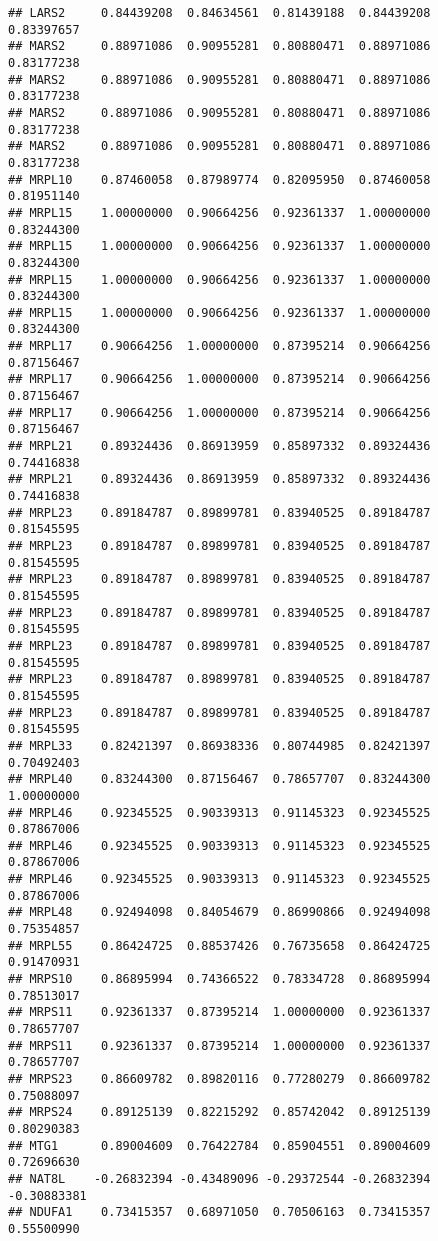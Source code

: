 \documentclass[
]{article}
\begin{document}
\begin{verbatim}
## LARS2     0.84439208  0.84634561  0.81439188  0.84439208  0.83397657
## MARS2     0.88971086  0.90955281  0.80880471  0.88971086  0.83177238
## MARS2     0.88971086  0.90955281  0.80880471  0.88971086  0.83177238
## MARS2     0.88971086  0.90955281  0.80880471  0.88971086  0.83177238
## MARS2     0.88971086  0.90955281  0.80880471  0.88971086  0.83177238
## MRPL10    0.87460058  0.87989774  0.82095950  0.87460058  0.81951140
## MRPL15    1.00000000  0.90664256  0.92361337  1.00000000  0.83244300
## MRPL15    1.00000000  0.90664256  0.92361337  1.00000000  0.83244300
## MRPL15    1.00000000  0.90664256  0.92361337  1.00000000  0.83244300
## MRPL15    1.00000000  0.90664256  0.92361337  1.00000000  0.83244300
## MRPL17    0.90664256  1.00000000  0.87395214  0.90664256  0.87156467
## MRPL17    0.90664256  1.00000000  0.87395214  0.90664256  0.87156467
## MRPL17    0.90664256  1.00000000  0.87395214  0.90664256  0.87156467
## MRPL21    0.89324436  0.86913959  0.85897332  0.89324436  0.74416838
## MRPL21    0.89324436  0.86913959  0.85897332  0.89324436  0.74416838
## MRPL23    0.89184787  0.89899781  0.83940525  0.89184787  0.81545595
## MRPL23    0.89184787  0.89899781  0.83940525  0.89184787  0.81545595
## MRPL23    0.89184787  0.89899781  0.83940525  0.89184787  0.81545595
## MRPL23    0.89184787  0.89899781  0.83940525  0.89184787  0.81545595
## MRPL23    0.89184787  0.89899781  0.83940525  0.89184787  0.81545595
## MRPL23    0.89184787  0.89899781  0.83940525  0.89184787  0.81545595
## MRPL23    0.89184787  0.89899781  0.83940525  0.89184787  0.81545595
## MRPL33    0.82421397  0.86938336  0.80744985  0.82421397  0.70492403
## MRPL40    0.83244300  0.87156467  0.78657707  0.83244300  1.00000000
## MRPL46    0.92345525  0.90339313  0.91145323  0.92345525  0.87867006
## MRPL46    0.92345525  0.90339313  0.91145323  0.92345525  0.87867006
## MRPL46    0.92345525  0.90339313  0.91145323  0.92345525  0.87867006
## MRPL48    0.92494098  0.84054679  0.86990866  0.92494098  0.75354857
## MRPL55    0.86424725  0.88537426  0.76735658  0.86424725  0.91470931
## MRPS10    0.86895994  0.74366522  0.78334728  0.86895994  0.78513017
## MRPS11    0.92361337  0.87395214  1.00000000  0.92361337  0.78657707
## MRPS11    0.92361337  0.87395214  1.00000000  0.92361337  0.78657707
## MRPS23    0.86609782  0.89820116  0.77280279  0.86609782  0.75088097
## MRPS24    0.89125139  0.82215292  0.85742042  0.89125139  0.80290383
## MTG1      0.89004609  0.76422784  0.85904551  0.89004609  0.72696630
## NAT8L    -0.26832394 -0.43489096 -0.29372544 -0.26832394 -0.30883381
## NDUFA1    0.73415357  0.68971050  0.70506163  0.73415357  0.55500990

\end{verbatim}
\end{document}

